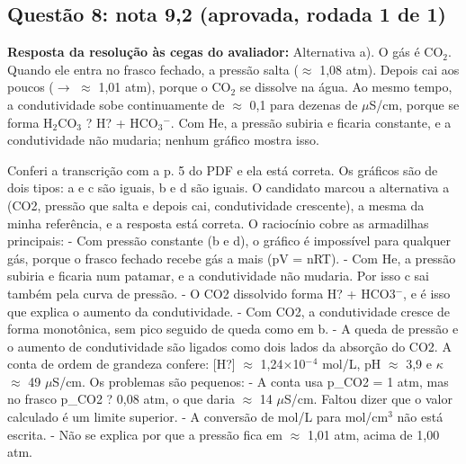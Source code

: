 \documentclass{article}%
\begin{document}
\subsection*{Questão 8: nota 9,2 (aprovada, rodada 1 de 1)}%
\textbf{Resposta da resolução às cegas do avaliador:} Alternativa a). O gás é CO$_{2}$. Quando ele entra no frasco fechado, a pressão salta ($\approx$ 1,08 atm). Depois cai aos poucos ($\to$ $\approx$ 1,01 atm), porque o CO$_{2}$ se dissolve na água. Ao mesmo tempo, a condutividade sobe continuamente de $\approx$ 0,1 para dezenas de $\mu$S/cm, porque se forma H$_{2}$CO$_{3}$ ? H? + HCO$_{3}$$^{-}$. Com He, a pressão subiria e ficaria constante, e a condutividade não mudaria; nenhum gráfico mostra isso.\par %
Conferi a transcrição com a p. 5 do PDF e ela está correta. Os gráficos são de dois tipos: a e c são iguais, b e d são iguais. O candidato marcou a alternativa a (CO2, pressão que salta e depois cai, condutividade crescente), a mesma da minha referência, e a resposta está correta. O raciocínio cobre as armadilhas principais:\newline%
{-} Com pressão constante (b e d), o gráfico é impossível para qualquer gás, porque o frasco fechado recebe gás a mais (pV = nRT).\newline%
{-} Com He, a pressão subiria e ficaria num patamar, e a condutividade não mudaria. Por isso c sai também pela curva de pressão.\newline%
{-} O CO2 dissolvido forma H? + HCO3$^{-}$, e é isso que explica o aumento da condutividade.\newline%
{-} Com CO2, a condutividade cresce de forma monotônica, sem pico seguido de queda como em b.\newline%
{-} A queda de pressão e o aumento de condutividade são ligados como dois lados da absorção do CO2.\newline%
\newline%
A conta de ordem de grandeza confere: {[}H?{]} $\approx$ 1,24$\times$10$^{-}$$^{4}$ mol/L, pH $\approx$ 3,9 e $\kappa$ $\approx$ 49 $\mu$S/cm. Os problemas são pequenos:\newline%
{-} A conta usa p\_CO2 = 1 atm, mas no frasco p\_CO2 ? 0,08 atm, o que daria $\approx$ 14 $\mu$S/cm. Faltou dizer que o valor calculado é um limite superior.\newline%
{-} A conversão de mol/L para mol/cm$^3$ não está escrita.\newline%
{-} Não se explica por que a pressão fica em $\approx$ 1,01 atm, acima de 1,00 atm.\newline%
\end{document}
